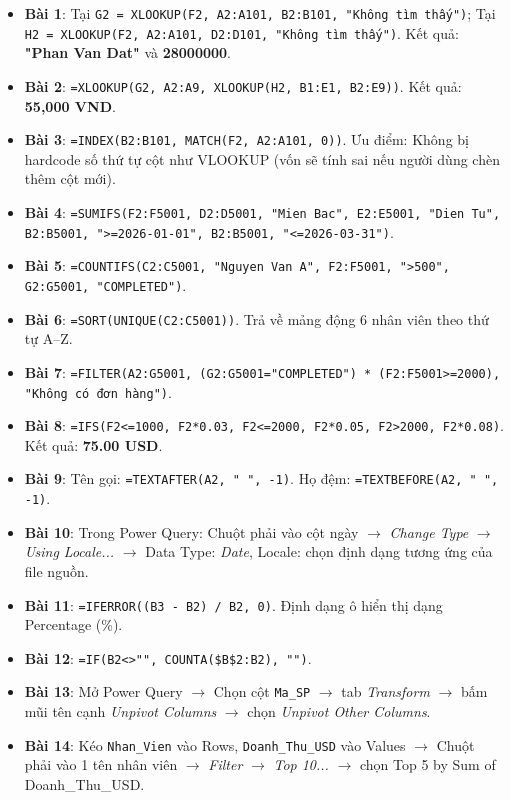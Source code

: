 \begin{dapanbox}
\begin{itemize}
    \item \textbf{Bài 1}: Tại \texttt{G2 = XLOOKUP(F2, A2:A101, B2:B101, "Không tìm thấy")}; Tại \texttt{H2 = XLOOKUP(F2, A2:A101, D2:D101, "Không tìm thấy")}. Kết quả: \textbf{"Phan Van Dat"} và \textbf{28000000}.
    \item \textbf{Bài 2}: \texttt{=XLOOKUP(G2, A2:A9, XLOOKUP(H2, B1:E1, B2:E9))}. Kết quả: \textbf{55,000 VND}.
    \item \textbf{Bài 3}: \texttt{=INDEX(B2:B101, MATCH(F2, A2:A101, 0))}. Ưu điểm: Không bị hardcode số thứ tự cột như VLOOKUP (vốn sẽ tính sai nếu người dùng chèn thêm cột mới).
    \item \textbf{Bài 4}: \texttt{=SUMIFS(F2:F5001, D2:D5001, "Mien Bac", E2:E5001, "Dien Tu", B2:B5001, ">=2026-01-01", B2:B5001, "<=2026-03-31")}.
    \item \textbf{Bài 5}: \texttt{=COUNTIFS(C2:C5001, "Nguyen Van A", F2:F5001, ">500", G2:G5001, "COMPLETED")}.
    \item \textbf{Bài 6}: \texttt{=SORT(UNIQUE(C2:C5001))}. Trả về mảng động 6 nhân viên theo thứ tự A--Z.
    \item \textbf{Bài 7}: \texttt{=FILTER(A2:G5001, (G2:G5001="COMPLETED") * (F2:F5001>=2000), "Không có đơn hàng")}.
    \item \textbf{Bài 8}: \texttt{=IFS(F2<=1000, F2*0.03, F2<=2000, F2*0.05, F2>2000, F2*0.08)}. Kết quả: \textbf{75.00 USD}.
    \item \textbf{Bài 9}: Tên gọi: \texttt{=TEXTAFTER(A2, " ", -1)}. Họ đệm: \texttt{=TEXTBEFORE(A2, " ", -1)}.
    \item \textbf{Bài 10}: Trong Power Query: Chuột phải vào cột ngày $\rightarrow$ \textit{Change Type} $\rightarrow$ \textit{Using Locale...} $\rightarrow$ Data Type: \textit{Date}, Locale: chọn định dạng tương ứng của file nguồn.
    \item \textbf{Bài 11}: \texttt{=IFERROR((B3 - B2) / B2, 0)}. Định dạng ô hiển thị dạng Percentage (\%).
    \item \textbf{Bài 12}: \texttt{=IF(B2<>"", COUNTA(\$B\$2:B2), "")}.
    \item \textbf{Bài 13}: Mở Power Query $\rightarrow$ Chọn cột \texttt{Ma\_SP} $\rightarrow$ tab \textit{Transform} $\rightarrow$ bấm mũi tên cạnh \textit{Unpivot Columns} $\rightarrow$ chọn \textit{Unpivot Other Columns}.
    \item \textbf{Bài 14}: Kéo \texttt{Nhan\_Vien} vào Rows, \texttt{Doanh\_Thu\_USD} vào Values $\rightarrow$ Chuột phải vào 1 tên nhân viên $\rightarrow$ \textit{Filter} $\rightarrow$ \textit{Top 10...} $\rightarrow$ chọn Top 5 by Sum of Doanh\_Thu\_USD.

\end{itemize}
\end{dapanbox}
